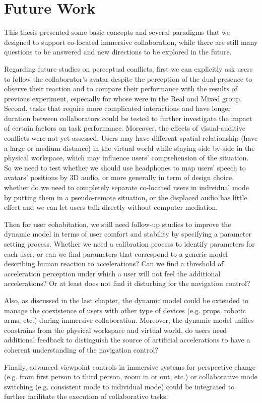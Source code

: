 \section*{Future Work}

This thesis presented some basic concepts and several paradigms that we designed to support co-located immersive collaboration, while there are still many questions to be answered and new directions to be explored in the future.

Regarding future studies on perceptual conflicts, first we can explicitly ask users to follow the collaborator's avatar despite the perception of the dual-presence to observe their reaction and to compare their performance with the results of previous experiment, especially for whose were in the Real and Mixed group. Second, tasks that require more complicated interactions and have longer duration between collaborators could be tested to further investigate the impact of certain factors on task performance. Moreover, the effects of visual-auditive conflicts were not yet assessed. Users may have different spatial relationship (have a large or medium distance) in the virtual world while staying side-by-side in the physical workspace, which may influence users' comprehension of the situation. So we need to test whether we should use headphones to map users' speech to avatars' positions by 3D audio, or more generally in term of design choice, whether do we need to completely separate co-located users in individual mode by putting them in a pseudo-remote situation, or the displaced audio has little effect and we can let users talk directly without computer mediation.

Then for user cohabitation, we still need follow-up studies to improve the dynamic model in terms of user comfort and stability by specifying a parameter setting process. Whether we need a calibration process to identify parameters for each user, or can we find parameters that correspond to a generic model describing human reaction to accelerations? Can we find a threshold of acceleration perception under which a user will not feel the additional accelerations? Or at least does not find it disturbing for the navigation control?

Also, as discussed in the last chapter, the dynamic model could be extended to manage the coexistence of users with other type of devices (e.g. props, robotic arms, etc.) during immersive collaboration. Moreover, the dynamic model unifies constrains from the physical workspace and virtual world, do users need additional feedback to distinguish the source of artificial accelerations to have a coherent understanding of the navigation control?

Finally, advanced viewpoint controls in immersive systems for perspective change (e.g. from first person to third person, zoom in or out, etc.) or collaborative mode switching (e.g. consistent mode to individual mode) could be integrated to further facilitate the execution of collaborative tasks.